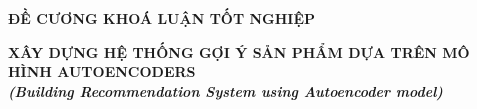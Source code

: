 \documentclass{article}[14pt]
\begin{document}
    \begin{figure}[h]
        \begin{floatrow}
        {%
    
        }
        {%
    
        }
        \end{floatrow}
    \end{figure}
    
    \begin{center}
        
        \textbf{\Large ĐỀ CƯƠNG KHOÁ LUẬN TỐT NGHIỆP} \\ 
    \end{center}
    
    
    \begin{center}
        
        \textbf{\huge  XÂY DỰNG HỆ THỐNG GỢI Ý SẢN PHẨM DỰA TRÊN MÔ HÌNH AUTOENCODERS} \\
        
    \vspace{.5cm}
        \textit{\textbf{\Large (Building Recommendation System using Autoencoder model)}}
    \end{center}
    
\end{document}
